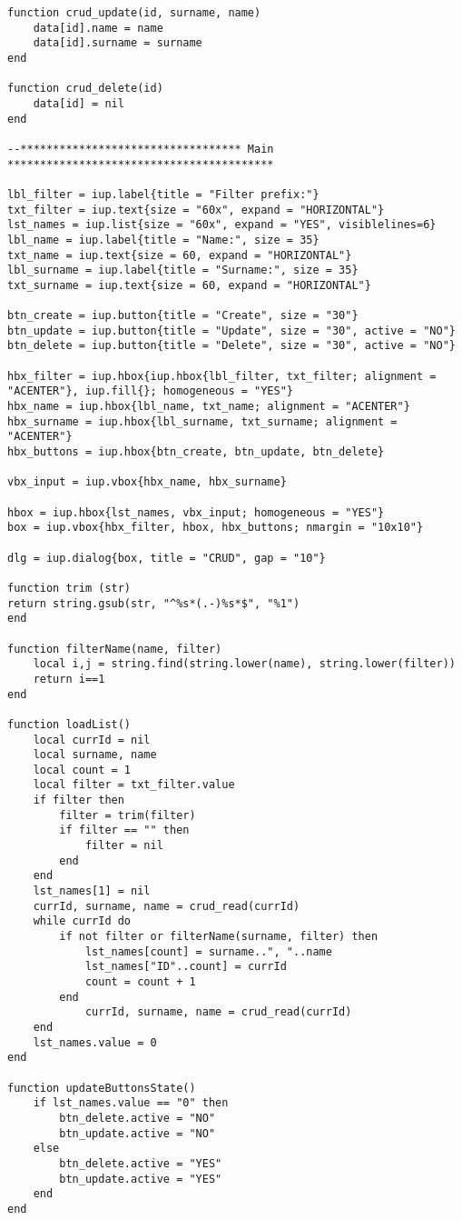 \documentclass{ctexart}
\begin{document}
\begin{lstlisting}
function crud_update(id, surname, name)
	data[id].name = name
	data[id].surname = surname
end

function crud_delete(id)
	data[id] = nil
end

--********************************** Main *****************************************

lbl_filter = iup.label{title = "Filter prefix:"}
txt_filter = iup.text{size = "60x", expand = "HORIZONTAL"}
lst_names = iup.list{size = "60x", expand = "YES", visiblelines=6}
lbl_name = iup.label{title = "Name:", size = 35}
txt_name = iup.text{size = 60, expand = "HORIZONTAL"}
lbl_surname = iup.label{title = "Surname:", size = 35}
txt_surname = iup.text{size = 60, expand = "HORIZONTAL"}

btn_create = iup.button{title = "Create", size = "30"}
btn_update = iup.button{title = "Update", size = "30", active = "NO"}
btn_delete = iup.button{title = "Delete", size = "30", active = "NO"}

hbx_filter = iup.hbox{iup.hbox{lbl_filter, txt_filter; alignment = "ACENTER"}, iup.fill{}; homogeneous = "YES"}
hbx_name = iup.hbox{lbl_name, txt_name; alignment = "ACENTER"}
hbx_surname = iup.hbox{lbl_surname, txt_surname; alignment = "ACENTER"}
hbx_buttons = iup.hbox{btn_create, btn_update, btn_delete}

vbx_input = iup.vbox{hbx_name, hbx_surname}

hbox = iup.hbox{lst_names, vbx_input; homogeneous = "YES"}
box = iup.vbox{hbx_filter, hbox, hbx_buttons; nmargin = "10x10"}

dlg = iup.dialog{box, title = "CRUD", gap = "10"}

function trim (str)
return string.gsub(str, "^%s*(.-)%s*$", "%1")
end

function filterName(name, filter)
	local i,j = string.find(string.lower(name), string.lower(filter))
	return i==1
end

function loadList()
	local currId = nil
	local surname, name
	local count = 1
	local filter = txt_filter.value
	if filter then
		filter = trim(filter)
		if filter == "" then
			filter = nil
		end
	end
	lst_names[1] = nil
	currId, surname, name = crud_read(currId)
	while currId do
		if not filter or filterName(surname, filter) then
			lst_names[count] = surname..", "..name
			lst_names["ID"..count] = currId
			count = count + 1
		end
			currId, surname, name = crud_read(currId)
	end
	lst_names.value = 0
end

function updateButtonsState()
	if lst_names.value == "0" then
		btn_delete.active = "NO"
		btn_update.active = "NO"
	else
		btn_delete.active = "YES"
		btn_update.active = "YES"
	end
end


\end{lstlisting}
\end{document}

